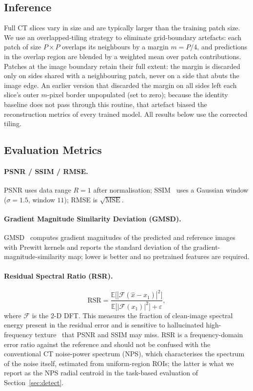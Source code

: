 \documentclass[letterpaper]{article} %
\begin{document}
\subsection{Inference}
\label{sec:inference}

Full CT slices vary in size and are typically larger than the training
patch size.  We use an overlapped-tiling strategy to eliminate
grid-boundary artefacts: each patch of size $P\times P$ overlaps its
neighbours by a margin $m = P/4$, and predictions in the overlap region are
blended by a weighted mean over patch contributions.  Patches at the image
boundary retain their full extent: the margin is discarded only on sides
shared with a neighbouring patch, never on a side that abuts the image
edge.  An earlier version that discarded the margin on all sides
left each slice's outer $m$-pixel border unpopulated (set to zero); because
the identity baseline does not pass through this routine, that artefact
biased the reconstruction metrics of every trained model.  All results
below use the corrected tiling.

\subsection{Evaluation Metrics}

\paragraph{PSNR / SSIM / RMSE.}
PSNR uses data range $R=1$ after normalisation; SSIM~\cite{wang2004image}
uses a Gaussian window ($\sigma=1.5$, window $11$); RMSE is
$\sqrt{\text{MSE}}$.

\paragraph{Gradient Magnitude Similarity Deviation (GMSD).}
GMSD~\cite{xue2014gradient} computes gradient magnitudes of the predicted
and reference images with Prewitt kernels and reports the standard
deviation of the gradient-magnitude-similarity map; lower is better and no
pretrained features are required.

\paragraph{Residual Spectral Ratio (RSR).}
\begin{equation}
  \text{RSR} = \frac{\mathbb{E}\bigl[|\mathcal{F}(\hat{x}-x_1)|^2\bigr]}
                    {\mathbb{E}\bigl[|\mathcal{F}(x_1)|^2\bigr] + \varepsilon},
  \label{eq:nps}
\end{equation}
where $\mathcal{F}$ is the 2-D DFT.  This measures the fraction of
clean-image spectral energy present in the residual error and is sensitive
to hallucinated high-frequency texture~\cite{gao2023corediff} that PSNR and
SSIM may miss.  RSR is a frequency-domain error ratio against the
reference and should not be confused with the conventional CT noise-power
spectrum (NPS), which characterises the spectrum of the noise itself,
estimated from uniform-region ROIs; the latter is what we report as the NPS
radial centroid in the task-based evaluation of Section~\ref{sec:detect}.
\end{document}
